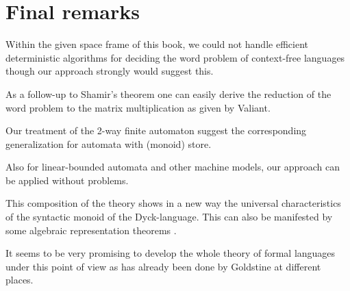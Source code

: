 \chapter*{Final remarks}

Within the given space frame of this book, we could not handle efficient deterministic 
algorithms for deciding the word problem of context-free languages though our
approach strongly would suggest this.

As a follow-up to Shamir's theorem one can easily derive the
reduction of the word problem to the matrix multiplication as given by Valiant.

Our treatment of the 2-way finite automaton suggest the corresponding
generalization for automata with (monoid) store.

Also for linear-bounded automata and other machine models, our approach can be
applied without problems.

This composition of the theory shows in a new way the universal characteristics
of the syntactic monoid of the Dyck-language. This can also be manifested by
some algebraic representation theorems \cite{Hotz81}.

It seems to be very promising to develop the whole theory of formal languages
under this point of view as has already been done by Goldstine
\cite{Goldstine77,Goldstine79,Goldstine80} at different places.
